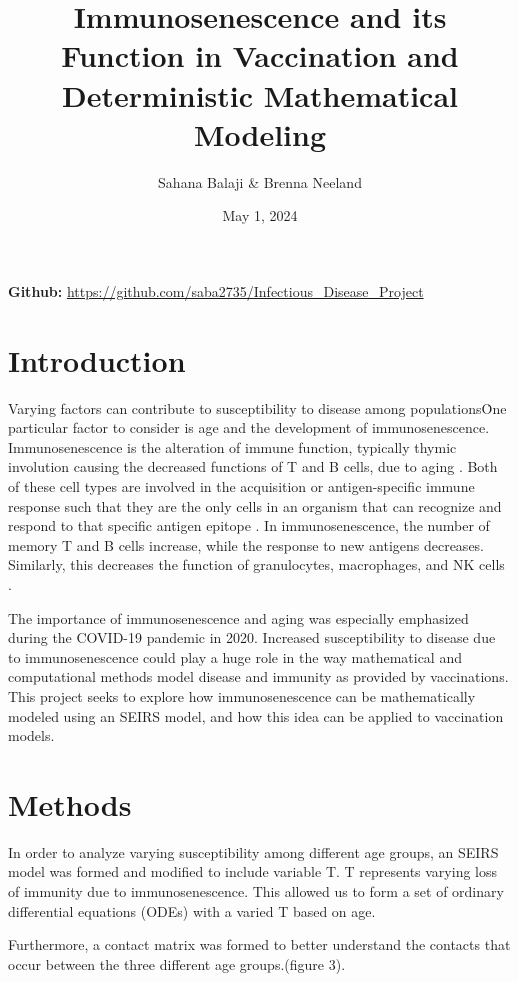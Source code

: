 \documentclass{report}
\title{Immunosenescence and its Function in Vaccination and Deterministic Mathematical Modeling}
\author{Sahana Balaji \& Brenna Neeland}
\date{May 1, 2024}
\begin{document}
\maketitle
\thispagestyle{fancy}
\textbf{Github:} \url{https://github.com/saba2735/Infectious_Disease_Project}

\section*{Introduction}

Varying factors can contribute to susceptibility to disease among populations\. One particular factor to consider is age and the development of immunosenescence. Immunosenescence is the alteration of immune function, typically thymic involution causing the decreased functions of T and B cells, due to aging \cite{rink2022}. Both of these cell types are involved in the acquisition or antigen-specific immune response such that they are the only cells in an organism that can recognize and respond to that specific antigen epitope \cite{cano2013}. In immunosenescence, the number of memory T and B cells increase, while the response to new antigens decreases. Similarly, this decreases the function of granulocytes, macrophages, and NK cells \cite{rink2022}.

The importance of immunosenescence and aging was especially emphasized during the COVID-19 pandemic in 2020. Increased susceptibility to disease due to immunosenescence could play a huge role in the way mathematical and computational methods model disease and immunity as provided by vaccinations. This project seeks to explore how immunosenescence can be mathematically modeled using an SEIRS model, and how this idea can be applied to vaccination models. 

\section*{Methods}
In order to analyze varying susceptibility among different age groups, an SEIRS model was formed and modified to include variable T. T represents varying loss of immunity due to immunosenescence. This allowed us to form a set of ordinary differential equations (ODEs) with a varied T based on age.

Furthermore, a contact matrix was formed to better understand the contacts that occur between the three different age groups.(figure 3). 
\end{document}
